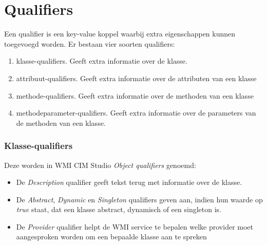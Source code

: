 \documentclass{report}
\begin{document}
	\section{Qualifiers}
	Een qualifier is een key-value koppel waarbij extra eigenschappen kunnen toegevoegd worden. Er bestaan vier soorten qualifiers:
	\begin{enumerate}
		\item klasse-qualifiers. Geeft extra informatie over de klasse. 
		\item attribuut-qualifiers. Geeft extra informatie over de attributen van een klasse
		\item methode-qualifiers. Geeft extra informatie over de methoden van een klasse
		\item methodeparameter-qualifiers. Geeft extra informatie over de parameters van de methoden van een klasse.
	\end{enumerate}
	\subsubsection{Klasse-qualifiers}
	Deze worden in WMI CIM Studio \textit{Object qualifiers} genoemd:
	\begin{itemize}
		\item De \textit{Description} qualifier geeft tekst terug met informatie over de klasse.
		\item De \textit{Abstract}, \textit{Dynamic} en \textit{Singleton} qualifiers geven aan, indien hun waarde op \textit{true} staat, dat een klasse abstract, dynamisch of een singleton is.
		\item De \textit{Provider} qualifier helpt de WMI service te bepalen welke provider moet aangesproken worden om een bepaalde klasse aan te spreken
	\end{itemize}
\end{document}
